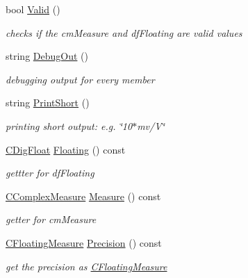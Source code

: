 \begin{DoxyCompactItemize}
bool \hyperlink{classCFloatingMeasure_a0ff3ae036cd2ee44d6b2eadc609b1d1a}{Valid} ()
\begin{DoxyCompactList}\small\item\em checks if the cm\+Measure and df\+Floating are valid values \end{DoxyCompactList}\item 
string \hyperlink{classCFloatingMeasure_a6d92f39204f23e81732cb77131517b6f}{Debug\+Out} ()
\begin{DoxyCompactList}\small\item\em debugging output for every member \end{DoxyCompactList}\item 
string \hyperlink{classCFloatingMeasure_af4caaa697967a257bc6e13117843ff58}{Print\+Short} ()
\begin{DoxyCompactList}\small\item\em printing short output\+: e.\+g. \char`\"{}10$\ast$mv/\+V\char`\"{} \end{DoxyCompactList}\item 
\hyperlink{classCDigFloat}{C\+Dig\+Float} \hyperlink{classCFloatingMeasure_ab41354d28783d125159bd6e9372c6d9f}{Floating} () const
\begin{DoxyCompactList}\small\item\em gettter for df\+Floating \end{DoxyCompactList}\item 
\hyperlink{classCComplexMeasure}{C\+Complex\+Measure} \hyperlink{classCFloatingMeasure_a8ac3af95a2619670a51d744c85b44463}{Measure} () const
\begin{DoxyCompactList}\small\item\em getter for cm\+Measure \end{DoxyCompactList}\item 
\hyperlink{classCFloatingMeasure}{C\+Floating\+Measure} \hyperlink{classCFloatingMeasure_ac8975daf37b98b3e996893e0de43c4eb}{Precision} () const
\begin{DoxyCompactList}\small\item\em get the precision as \hyperlink{classCFloatingMeasure}{C\+Floating\+Measure} \end{DoxyCompactList}\end{DoxyCompactItemize}
